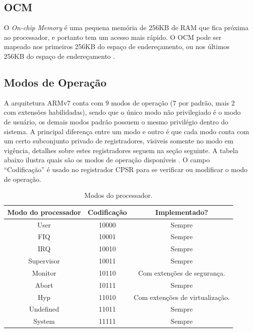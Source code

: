 \subsection{OCM} O \emph{On-chip Memory} é uma pequena memória de 256KB de RAM que fica próxima ao processador, e portanto tem um acesso mais rápido. O OCM pode ser mapeado nos primeiros 256KB do espaço de endereçamento, ou nos últimos 256KB do espaço de endereçamento \cite{ug585}.


\subsection{Modos de Operação}
\label{sec:operating_modes}
A arquitetura ARMv7 conta com 9 modos de operação (7 por padrão, mais 2 com extensões habilidadas), sendo que o único modo não privilegiado é o modo de usuário, os demais modos padrão possuem o mesmo privilégio dentro do sistema. A principal diferença entre um modo e outro é que cada modo conta com um certo subconjunto privado de registradores, visiveis somente no modo em vigência, detalhes sobre estes registradores seguem na seção seguinte. A tabela abaixo ilustra quais são os modos de operação disponíveis \cite[p.~1139]{armarm}.
O campo ``Codificação'' é usado no registrador CPSR para se verificar ou modificar o modo de operação.

\begin{table}[ht]
\centering
\begin{tabular}{ccc}
\hline\hline                        %
Modo do processador  & Codificação & Implementado?\\ [0.5ex] %
\hline                  %
User & 10000 & Sempre \\
FIQ & 10001 & Sempre \\
IRQ & 10010 & Sempre \\
Supervisor & 10011 & Sempre\\
Monitor & 10110 & Com extenções de segurança.\\
Abort & 10111 & Sempre\\
Hyp & 11010 & Com extenções de virtualização.\\
Undefined & 11011 & Sempre\\
System & 11111 & Sempre\\[1ex]
\hline %
\end{tabular}
\caption{Modos do processador.}
\label{tab.processormode} %
\end{table}

